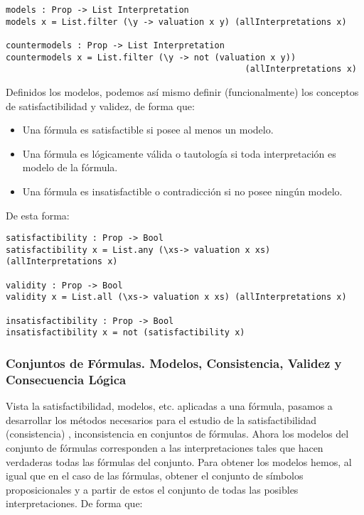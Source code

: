 \documentclass[a4paper]{report}
\begin{document}
\begin{lstlisting}[caption= Función para el cálculo de los modelos de una fórmula proposicional]
models : Prop -> List Interpretation
models x = List.filter (\y -> valuation x y) (allInterpretations x)

countermodels : Prop -> List Interpretation
countermodels x = List.filter (\y -> not (valuation x y)) 
                                               (allInterpretations x)
\end{lstlisting}

Definidos los modelos, podemos así mismo definir (funcionalmente) los conceptos de satisfactibilidad y validez, de forma que:

\begin{itemize}
\item Una fórmula es satisfactible si posee al menos un modelo.
\item Una fórmula es lógicamente válida o tautología si toda interpretación es modelo de la fórmula.
\item Una fórmula es insatisfactible o contradicción si no posee ningún modelo.
\end{itemize}

De esta forma:

\newpage

\begin{lstlisting}[caption={Funciones de Satisfactibilidad, Validez e Insatisfactibilidad}]
satisfactibility : Prop -> Bool
satisfactibility x = List.any (\xs-> valuation x xs) (allInterpretations x)

validity : Prop -> Bool
validity x = List.all (\xs-> valuation x xs) (allInterpretations x)

insatisfactibility : Prop -> Bool
insatisfactibility x = not (satisfactibility x)
\end{lstlisting}

\subsubsection{Conjuntos de Fórmulas. Modelos, Consistencia, Validez y Consecuencia Lógica}

Vista la satisfactibilidad, modelos, etc. aplicadas a una fórmula, pasamos a desarrollar los métodos necesarios para el estudio de la satisfactibilidad (consistencia) , inconsistencia en conjuntos de fórmulas. Ahora los modelos del conjunto de fórmulas corresponden a las interpretaciones tales que hacen verdaderas todas las fórmulas del conjunto. Para obtener los modelos hemos, al igual que en el caso de las fórmulas, obtener el conjunto de símbolos proposicionales y a partir de estos el conjunto de todas las posibles interpretaciones. De forma que:\\
\end{document}
